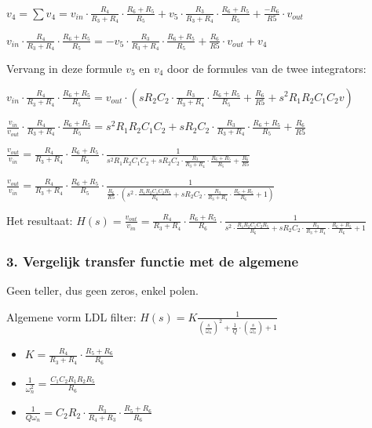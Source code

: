 \documentclass[]{article}
\begin{document}
\(v_4 = \sum{v_4} = v_{in} \cdot \frac{R_4}{R_3+R_4} \cdot \frac{R_6+R_5}{R_5} + v_5 \cdot \frac{R_3}{R_3+R_4} \cdot \frac{R_6+R_5}{R_5} + \frac{-R_6}{R5} \cdot v_{out}\)

\(v_{in} \cdot \frac{R_4}{R_3+R_4} \cdot \frac{R_6+R_5}{R_5} = -v_5 \cdot \frac{R_3}{R_3+R_4} \cdot \frac{R_6+R_5}{R_5} + \frac{R_6}{R5} \cdot v_{out} + v_4\)

Vervang in deze formule \(v_5\) en \(v_4\) door de formules van de twee
integrators:

\(v_{in} \cdot \frac{R_4}{R_3+R_4} \cdot \frac{R_6+R_5}{R_5} = v_{out} \cdot (sR_2C_2 \cdot \frac{R_3}{R_3+R_4} \cdot \frac{R_6+R_5}{R_5} + \frac{R_6}{R5} + s^2R_1R_2C_1C_2v)\)

\(\frac{v_{in}}{v_{out}} \cdot \frac{R_4}{R_3+R_4} \cdot \frac{R_6+R_5}{R_5} = s^2R_1R_2C_1C_2 + sR_2C_2 \cdot \frac{R_3}{R_3+R_4} \cdot \frac{R_6+R_5}{R_5} + \frac{R_6}{R5}\)

\(\frac{v_{out}}{v_{in}} = \frac{R_4}{R_3+R_4} \cdot \frac{R_6+R_5}{R_5} \cdot \frac{1}{s^2R_1R_2C_1C_2 + sR_2C_2 \cdot \frac{R_3}{R_3+R_4} \cdot \frac{R_6+R_5}{R_5} + \frac{R_6}{R5}}\)

\(\frac{v_{out}}{v_{in}} = \frac{R_4}{R_3+R_4} \cdot \frac{R_6+R_5}{R_5} \cdot \frac{1}{\frac{R_6}{R5} \cdot (s^2 \cdot \frac{R_1R_2C_1C_2R_5}{R_6} + sR_2C_2 \cdot \frac{R_3}{R_3+R_4} \cdot \frac{R_6+R_5}{R_6} + 1)}\)

Het resultaat:
\(H(s) = \frac{v_{out}}{v_{in}} = \frac{R_4}{R_3+R_4} \cdot \frac{R_6+R_5}{R_6} \cdot \frac{1}{s^2 \cdot \frac{R_1R_2C_1C_2R_5}{R_6} + sR_2C_2 \cdot \frac{R_3}{R_3+R_4} \cdot \frac{R_6+R_5}{R_6} + 1}\)

\hypertarget{header-n5382}{%
\subsubsection{3. Vergelijk transfer functie met de
algemene}\label{header-n5382}}

Geen teller, dus geen zeros, enkel polen.

Algemene vorm LDL filter:
\(H(s) = K\frac{1}{(\frac{s}{\omega_n})^2+\frac{1}{Q}\cdot(\frac{s}{\omega_n})+1}\)

\begin{itemize}
\item
  \(K=\frac{R_4}{R_3+R_4} \cdot \frac{R_5+R_6}{R_6}\)
\item
  \(\frac{1}{\omega_n^2} = \frac{C_1C_2R_1R_2R_5}{R_6}\)
\item
  \(\frac{1}{Q\omega_n}=C_2R_2 \cdot \frac{R_3}{R_4+R_3} \cdot \frac{R_5+R_6}{R_6}\)
\end{itemize}
\end{document}
